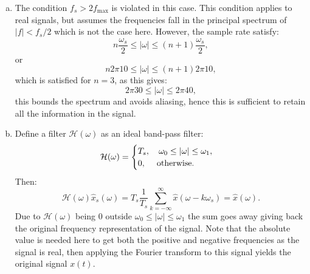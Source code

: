 \begin{enumerate}
\begin{enumerate}[a)]
          \item The condition $f_{s}>2f_{\text{max}}$ is violated in this case.
                This condition applies to real signals, but assumes the frequencies fall in the principal 
                spectrum of $|f|<f_{s}/2$ which is not the case here.
                However, the sample rate satisfy:
                \[ n\frac{\omega_{s}}{2}\le|\omega|\le(n+1)\frac{\omega_{s}}{2}, \]
                or
                \[ n2\pi 10\le|\omega|\le (n+1)2\pi10, \]
                which is satisfied for $n=3$, as this gives:
                \[ 2\pi 30\le |\omega|\le 2\pi 40, \]
                this bounds the spectrum and avoids aliasing, hence this is sufficient to 
                retain all the information in the signal.

          \item Define a filter $\mathcal{H}(\omega)$ as an ideal band-pass filter:
                \[\mathcal{H}(\omega)=\begin{cases}
                    T_{s}, \quad \omega_{0}\le|\omega|\le\omega_{1}, \\
                    0, \quad \hspace{0.1cm}\text{otherwise}.
                  \end{cases}\]
                Then:
                \[ \mathcal{H}(\omega)\hat{x}_{s}(\omega)=T_{s}\frac{1}{T_{s}}\sum_{k=-\infty}^{\infty}\hat{x}(\omega-k\omega_{s})=\hat{x}(\omega). \]
                Due to $\mathcal{H}(\omega)$ being $0$ outside $\omega_{0}\le|\omega|\le\omega_{1}$ the 
                sum goes away giving back the original frequency representation of the signal.
                Note that the absolute value is needed here to get both the positive and negative 
                frequencies as the signal is real, then applying the Fourier transform to 
                this signal yields the original signal $x(t)$.
        \end{enumerate}

\end{enumerate}

